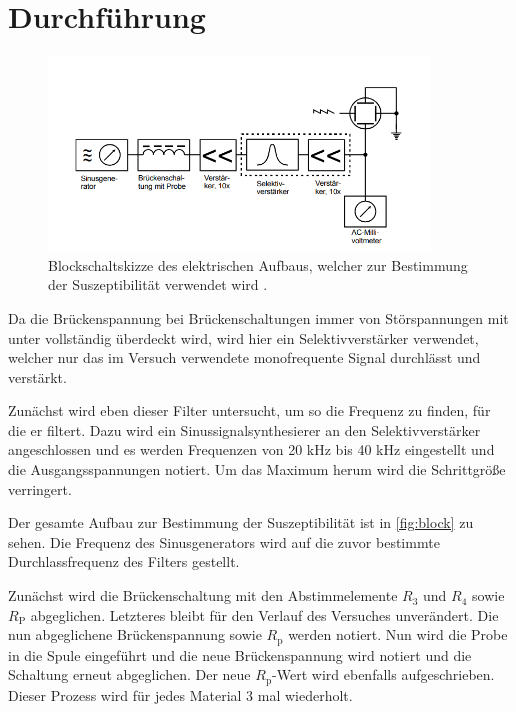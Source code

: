 \section{Durchführung}
\label{sec:Durchführung}

\begin{figure}
    \centering
    \includegraphics[width=0.90\textwidth]{content/blockschalt.png}
    \caption{Blockschaltskizze des elektrischen Aufbaus, welcher zur Bestimmung der Suszeptibilität verwendet wird \cite{V606}.}
    \label{fig:block}
\end{figure}

Da die Brückenspannung bei Brückenschaltungen immer von Störspannungen mit unter vollständig überdeckt wird,
wird hier ein Selektivverstärker verwendet, welcher nur das im Versuch verwendete monofrequente Signal durchlässt und verstärkt.

Zunächst wird eben dieser Filter untersucht, um so die Frequenz zu finden, für die er filtert.
Dazu wird ein Sinussignalsynthesierer an den Selektivverstärker angeschlossen und es werden Frequenzen von 20 kHz bis 40 kHz eingestellt und die Ausgangsspannungen notiert.
Um das Maximum herum wird die Schrittgröße verringert.

Der gesamte Aufbau zur Bestimmung der Suszeptibilität ist in \autoref{fig:block} zu sehen.
Die Frequenz des Sinusgenerators wird auf die zuvor bestimmte Durchlassfrequenz des Filters gestellt.

Zunächst wird die Brückenschaltung mit den Abstimmelemente $R_3$ und $R_4$ sowie $R_\text{P}$ abgeglichen.
Letzteres bleibt für den Verlauf des Versuches unverändert.
Die nun abgeglichene Brückenspannung sowie $R_\text{p}$ werden notiert.
Nun wird die Probe in die Spule eingeführt und die neue Brückenspannung wird notiert und die Schaltung erneut abgeglichen.
Der neue $R_\text{p}$-Wert wird ebenfalls aufgeschrieben.
Dieser Prozess wird für jedes Material 3 mal wiederholt.